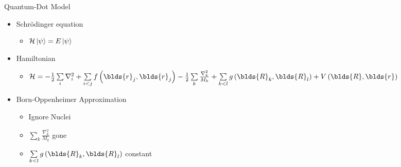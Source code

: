 \documentclass[10pt, t]{beamer}
\begin{document}
\begin{frame}[fragile]{Quantum-Dot Model}
    \begin{itemize}
        \item Schrödinger equation 
            \begin{itemize}
                \item $\mathcal{H}\ket{\psi} = E\ket{\psi}$
            \end{itemize}
        \item Hamiltonian
            \begin{itemize}
                \item $\mathcal{H} = - \frac{1}{2} \sum\limits_i \nabla^2_i +
                    \sum\limits_{i<j} f\left(\blds{r}_j, \blds{r}_j\right) -
                    \frac{1}{2} \sum\limits_k \frac{\nabla^2_k}{M_k} + \sum\limits_{k<l}
                    g\left(\blds{R}_k,\blds{R}_l\right) +
                    V\left(\blds{R},\blds{r}\right)$
            \end{itemize}
        \item Born-Oppenheimer Approximation
            \begin{itemize}
                \item Ignore Nuclei
                \item $\sum\limits_k \frac{\nabla^2_k}{M_k}$ gone
                \item $\sum\limits_{k<l} g\left(\blds{R}_k,\blds{R}_l\right)$ constant
            \end{itemize}
    \end{itemize}
\end{frame}
\end{document}
